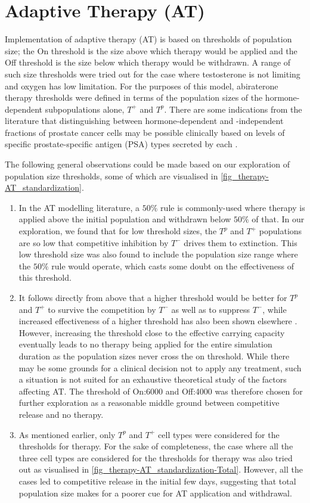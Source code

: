 \section{Adaptive Therapy (AT)}
Implementation of adaptive therapy (AT) is based on thresholds of population size; the On threshold is the size above which therapy would be applied and the Off threshold is the size below which therapy would be withdrawn. A range of such size thresholds were tried out for the case where testosterone is not limiting and oxygen has low limitation. For the purposes of this model, abiraterone therapy thresholds were defined in terms of the population sizes of the hormone-dependent subpopulations alone, $T^+$ and $T^p$. There are some indications from the literature that distinguishing between hormone-dependent and -independent fractions of prostate cancer cells may be possible clinically based on levels of specific prostate-specific antigen (PSA) types secreted by each \cite{Takahashi}.

The following general observations could be made based on our exploration of population size thresholds, some of which are visualised in \autoref{fig_therapy-AT_standardization}.
\begin{enumerate}
  \item In the AT modelling literature, a $50\%$ rule is commonly-used where therapy is applied above the initial population and withdrawn below $50\%$ of that. In our exploration, we found that for low threshold sizes, the $T^p$ and $T^+$ populations are so low that competitive inhibition by $T^-$ drives them to extinction. This low threshold size was also found to include the population size range where the $50\%$ rule would operate, which casts some doubt on the effectiveness of this threshold.
  \item It follows directly from above that a higher threshold would be better for $T^p$ and $T^+$ to survive the competition by $T^-$ as well as to suppress $T^-$, while increased effectiveness of a higher threshold has also been shown elsewhere \cite{Hansen}. However, increasing the threshold close to the effective carrying capacity eventually leads to no therapy being applied for the entire simulation duration as the population sizes never cross the on threshold. While there may be some grounds for a clinical decision not to apply any treatment, such a situation is not suited for an exhaustive theoretical study of the factors affecting AT. The threshold of On:6000 and Off:4000 was therefore chosen for further exploration as a reasonable middle ground between competitive release and no therapy.
  \item As mentioned earlier, only $T^p$ and $T^+$ cell types were considered for the thresholds for therapy. For the sake of completeness, the case where all the three cell types are considered for the thresholds for therapy was also tried out as visualised in \autoref{fig_therapy-AT_standardization-Total}. However, all the cases led to competitive release in the initial few days, suggesting that total population size makes for a poorer cue for AT application and withdrawal.
\end{enumerate}

